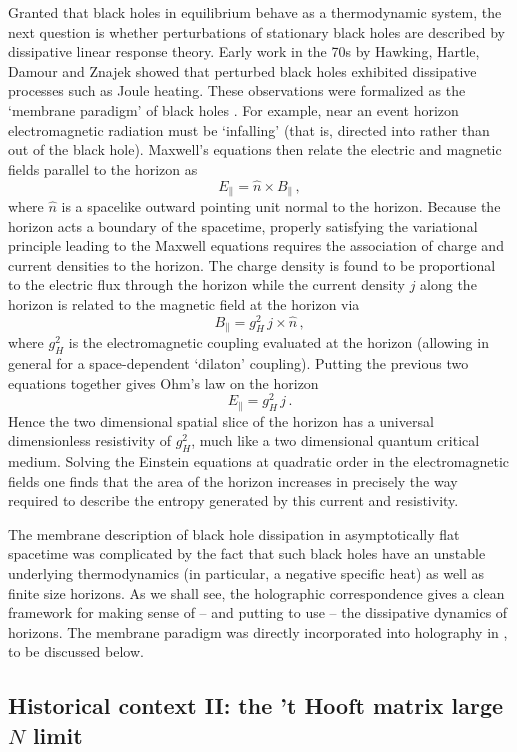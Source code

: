 \documentclass[10pt, oneside]{book}
\def\be{\begin{equation}}
\def\ee{\end{equation}}
\begin{document}
\begin{doublespace}
Granted that black holes in equilibrium behave as a thermodynamic system, the next question is whether perturbations of stationary black holes are described by dissipative linear response theory. Early work in the 70s by Hawking, Hartle, Damour and Znajek showed that perturbed black holes exhibited dissipative processes such as Joule heating. These observations were formalized as the `membrane paradigm' of black holes \cite{Price:1986yy, Thorne:1986iy, Parikh:1997ma}. For example, near an event horizon electromagnetic radiation must be `infalling' (that is, directed into rather than out of the black hole). Maxwell's equations then relate the electric and magnetic fields parallel to the horizon as
\be\label{eq:firstin}
E_\parallel = \hat n \times B_\parallel \,, 
\ee
where $\hat n$ is a spacelike outward pointing unit normal to the horizon. Because the horizon acts a boundary of the spacetime, properly satisfying the variational principle leading to the Maxwell equations requires the association of charge and current densities to the horizon. The charge density is found to be proportional to the electric flux through the horizon while the current density $j$ along the horizon is related to the magnetic field at the horizon via
\be
B_\parallel = g^2_H \, j \times \hat n \,,
\ee
where $g^2_H$ is the electromagnetic coupling evaluated at the horizon (allowing in general for a space-dependent `dilaton' coupling).
Putting the previous two equations together gives Ohm's law on the horizon
\be
E_\parallel = g^2_H \, j \,.
\ee
Hence the two dimensional spatial slice of the horizon has a universal dimensionless resistivity of $g^2_H$, much like a two dimensional quantum critical medium. Solving the Einstein equations at quadratic order in the electromagnetic fields one finds that the area of the horizon increases in precisely the way required to describe the entropy generated by this current and resistivity.

The membrane description of black hole dissipation in asymptotically flat spacetime was complicated by the fact that such black holes have an unstable underlying thermodynamics (in particular, a negative specific heat) as well as finite size horizons. As we shall see, the holographic correspondence gives a clean framework for making sense of -- and putting to use -- the dissipative dynamics of horizons. The membrane paradigm was directly incorporated into holography in \cite{Kovtun:2003wp, Iqbal:2008by}, to be discussed below.

\subsection{Historical context II: the 't Hooft matrix large $N$ limit}
\label{sec:thooft}


\end{doublespace}
\end{document}
